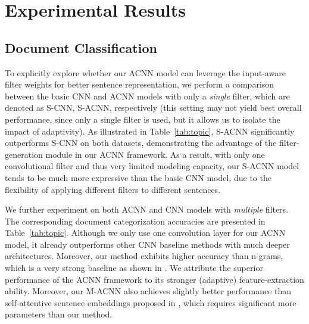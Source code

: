 \documentclass[11pt,a4paper]{article}
\begin{document}
\section{Experimental Results}
\subsection{Document Classification}
To explicitly explore whether our ACNN model can leverage the input-aware filter weights for better sentence representation, we perform a comparison between the basic CNN and ACNN models with only a \emph{single} filter, which are denoted as S-CNN, S-ACNN, respectively (this setting may not yield best overall performance, since only a single filter is used, but it allows us to isolate the impact of adaptivity). As illustrated in Table~\ref{tab:topic}, S-ACNN significantly outperforms S-CNN on both datasets, demonstrating the advantage of the filter-generation module in our ACNN framework. As a result, with only one convolutional filter and thus very limited modeling capacity, our S-ACNN model tends to be much more expressive than the basic CNN model, due to the flexibility of applying different filters to different sentences.

We further experiment on both ACNN and CNN models with \emph{multiple} filters. The corresponding document categorization accuracies are presented in Table~\ref{tab:topic}. Although we only use one convolution layer for our ACNN model, it already outperforms other CNN baseline methods with much deeper architectures. Moreover, our method exhibits higher accuracy than n-grams, which is a very strong baseline as shown in \cite{zhang2015character}. We attribute the superior performance of the ACNN framework to its stronger (adaptive) feature-extraction ability. Moreover, our M-ACNN also achieves slightly better performance than self-attentive sentence embeddings proposed in \citet{lin2017structured}, which requires significant more parameters than our method.
\end{document}
